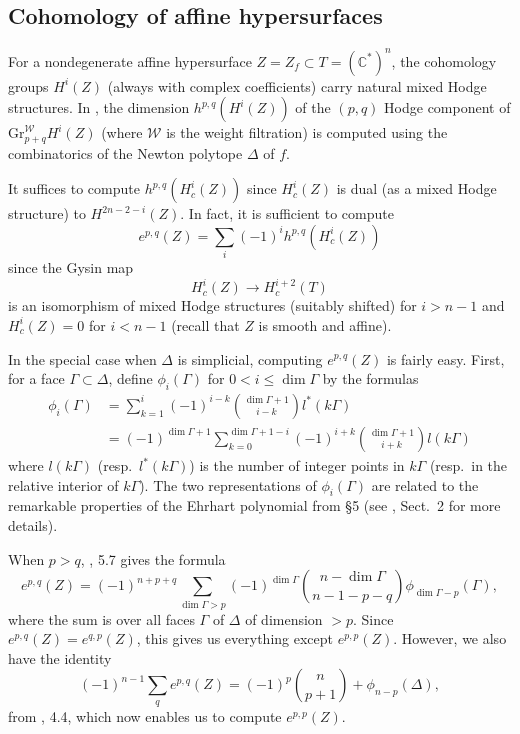 \documentclass{amsart}
\theoremstyle{plain}
\theoremstyle{definition}
\begin{document}
	\subsection{Cohomology of affine hypersurfaces} For a
nondegenerate affine hypersurface $Z = Z_f \subset T = (\mathbb{C}^*)^n$, the cohomology groups $H^i(Z)$ (always with complex
coefficients) carry natural mixed Hodge structures.  In \cite{DK}, the
dimension $h^{p,q}(H^i(Z))$ of the $(p,q)$ Hodge component of
$\mathrm{Gr}^{\mathcal{W}}_{p+q} H^i(Z)$ (where $\mathcal{W}$ is the weight
filtration) is computed using the combinatorics of the Newton polytope
$\Delta$ of $f$.

	It suffices to compute $h^{p,q}(H^i_c(Z))$ since $H^i_c(Z)$ is
dual (as a mixed Hodge structure) to $H^{2n-2-i}(Z)$.  In fact, it is
sufficient to compute 
\[
e^{p,q}(Z) = \sum_i (-1)^i h^{p,q}(H_c^i(Z))
\]
since the Gysin map
\[
H_c^i(Z) \longrightarrow H_c^{i+2}(T)
\]
is an isomorphism of mixed Hodge structures (suitably shifted) for $i
> n-1$ and $H^i_c(Z) = 0$ for $i < n-1$ (recall that $Z$ is smooth
and affine).    

	In the special case when $\Delta$ is simplicial, computing
$e^{p,q}(Z)$ is fairly easy.  First, for a face $\Gamma \subset
\Delta$, define $\phi_i(\Gamma)$ for $0 < i \le \dim \Gamma$ by the
formulas
\begin{equation}
\begin{aligned}
\phi_i(\Gamma) &= \sum_{k=1}^i (-1)^{i-k} \binom{\dim \Gamma +1}{i-k}
l^*(k\Gamma)\\
	&= (-1)^{\dim \Gamma + 1} \sum_{k=0}^{\dim \Gamma + 1 - i}
(-1)^{i+k} \binom{\dim \Gamma +1}{i+k} l(k\Gamma)
\end{aligned}
\tag{6.3}\label{eq:6.3}
\end{equation}
where $l(k\Gamma)$ (resp.\ $l^*(k\Gamma)$) is the number of integer
points in $k\Gamma$ (resp.\ in the relative interior of $k\Gamma$).
The two representations of $\phi_i(\Gamma)$ are related to the
remarkable properties of the Ehrhart polynomial from \S5 (see
\cite{Bat4}, Sect.~2 for more details).

	When $p > q$, \cite{DK}, 5.7 gives the formula
\[
e^{p,q}(Z) = (-1)^{n+p+q} \sum_{\dim\Gamma > p} (-1)^{\dim \Gamma}
\binom{n-\dim \Gamma}{n-1-p-q}\phi_{\dim \Gamma - p}(\Gamma),
\]
where the sum is over all faces $\Gamma$ of $\Delta$ of dimension $>
p$.  Since $e^{p,q}(Z) = e^{q,p}(Z)$, this gives us everything except
$e^{p,p}(Z)$.  However, we also have the identity
\begin{equation}
(-1)^{n-1}\sum_q e^{p,q}(Z) = (-1)^p\binom{n}{p+1} +
\phi_{n-p}(\Delta),
\tag{6.4}\label{eq:6.4}
\end{equation}
from \cite{DK}, 4.4, which now enables us to compute
$e^{p,p}(Z)$.  
\end{document}
